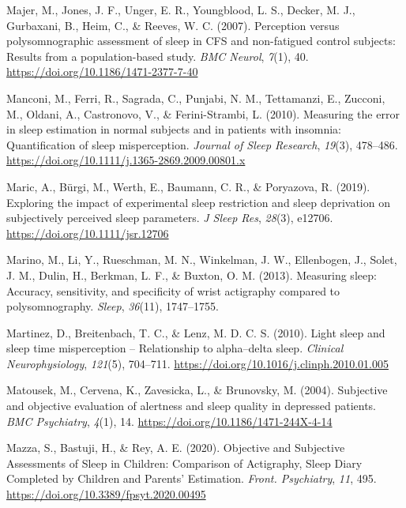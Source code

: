 \documentclass[
]{article}
\newlength{\cslhangindent}
\newenvironment{CSLReferences}[2] %
 {\begin{list}{}{%
  \setlength{\itemindent}{0pt}
  \setlength{\leftmargin}{0pt}
  \setlength{\parsep}{0pt}
  \ifodd #1
   \setlength{\leftmargin}{\cslhangindent}
   \setlength{\itemindent}{-1\cslhangindent}
  \fi
  \setlength{\itemsep}{#2\baselineskip}}}
 {\end{list}}
\begin{document}
\begin{CSLReferences}{1}{0}
Majer, M., Jones, J. F., Unger, E. R., Youngblood, L. S., Decker, M. J., Gurbaxani, B., Heim, C., \& Reeves, W. C. (2007). Perception versus polysomnographic assessment of sleep in {CFS} and non-fatigued control subjects: Results from a population-based study. \emph{BMC Neurol}, \emph{7}(1), 40. \url{https://doi.org/10.1186/1471-2377-7-40}

Manconi, M., Ferri, R., Sagrada, C., Punjabi, N. M., Tettamanzi, E., Zucconi, M., Oldani, A., Castronovo, V., \& Ferini-Strambi, L. (2010). Measuring the error in sleep estimation in normal subjects and in patients with insomnia: {Quantification} of sleep misperception. \emph{Journal of Sleep Research}, \emph{19}(3), 478--486. \url{https://doi.org/10.1111/j.1365-2869.2009.00801.x}

Maric, A., Bürgi, M., Werth, E., Baumann, C. R., \& Poryazova, R. (2019). Exploring the impact of experimental sleep restriction and sleep deprivation on subjectively perceived sleep parameters. \emph{J Sleep Res}, \emph{28}(3), e12706. \url{https://doi.org/10.1111/jsr.12706}

Marino, M., Li, Y., Rueschman, M. N., Winkelman, J. W., Ellenbogen, J., Solet, J. M., Dulin, H., Berkman, L. F., \& Buxton, O. M. (2013). Measuring sleep: Accuracy, sensitivity, and specificity of wrist actigraphy compared to polysomnography. \emph{Sleep}, \emph{36}(11), 1747--1755.

Martinez, D., Breitenbach, T. C., \& Lenz, M. D. C. S. (2010). Light sleep and sleep time misperception -- {Relationship} to alpha--delta sleep. \emph{Clinical Neurophysiology}, \emph{121}(5), 704--711. \url{https://doi.org/10.1016/j.clinph.2010.01.005}

Matousek, M., Cervena, K., Zavesicka, L., \& Brunovsky, M. (2004). Subjective and objective evaluation of alertness and sleep quality in depressed patients. \emph{BMC Psychiatry}, \emph{4}(1), 14. \url{https://doi.org/10.1186/1471-244X-4-14}

Mazza, S., Bastuji, H., \& Rey, A. E. (2020). Objective and {Subjective} {Assessments} of {Sleep} in {Children}: {Comparison} of {Actigraphy}, {Sleep} {Diary} {Completed} by {Children} and {Parents}' {Estimation}. \emph{Front. Psychiatry}, \emph{11}, 495. \url{https://doi.org/10.3389/fpsyt.2020.00495}


\end{CSLReferences}
\end{document}
